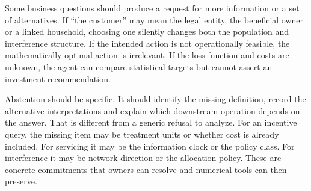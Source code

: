 Some business questions should produce a request for more information or a set
of alternatives. If ``the customer'' may mean the legal entity, the beneficial
owner or a linked household, choosing one silently changes both the population
and interference structure. If the intended action is not operationally
feasible, the mathematically optimal action is irrelevant. If the loss function
and costs are unknown, the agent can compare statistical targets but cannot
assert an investment recommendation.

Abstention should be specific. It should identify the missing definition,
record the alternative interpretations and explain which downstream operation
depends on the answer. That is different from a generic refusal to analyze.
For an incentive query, the missing item may be treatment units or whether
cost is already included. For servicing it may be the information clock or
the policy class. For interference it may be network direction or the allocation
policy. These are concrete commitments that owners can resolve and numerical
tools can then preserve.
